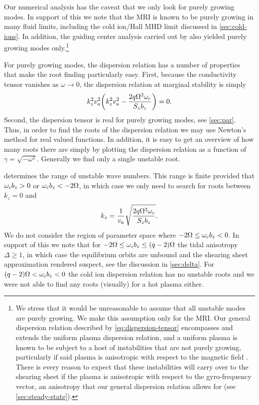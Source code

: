 \documentclass[aps,pre,notitlepage,amsmath,amssymb,amsfonts,nobibnotes,nofootinbib]{revtex4-1}
\begin{document}
Our numerical analysis has the caveat that we only look for purely growing
modes. In support of this we note that the MRI is known to be purely growing
in many fluid limits, including the cold ion/Hall MHD limit discussed in
\cref{sec:cold-ions}. In addition, the guiding center analysis carried out by
\citet{Quataert2002} also yielded purely growing modes only.\footnote{We
  stress that it would be unreasonable to assume that all unstable modes are
  purely growing. We make this assumption only for the MRI\@. Our general
  dispersion relation described by \cref{eq:dispersion-tensor} encompasses and
  extends the uniform plasma dispersion relation, and a uniform plasma is
  known to be subject to a host of instabilities that are not purely growing,
  particularly if said plasma is anisotropic with respect to the magnetic
  field \citep[see][and references therein]{Schekochihin2005,Sharma2006}.
  There is every reason to expect that these instabilities will carry over to
  the shearing sheet if the plasma is anisotropic with respect to the
  gyro-frequency vector, an anisotropy that our general dispersion relation
  allows for (see \cref{sec:steady-state}).}

For purely growing modes, the dispersion relation has a number of properties
that make the root finding particularly easy. First, because the conductivity
tensor vanishes as $\omega\to0$, the dispersion relation at marginal stability
is simply
\begin{equation}
  \label{eq:marginal-stability}
  k_z^2\va^2\left(k_z^2\va^2 - \frac{2q\Omega^2\omc}{S_z b_z}\right) = 0.
\end{equation}
Second, the dispersion tensor is real for purely growing modes, see
\cref{sec:par}. Thus, in order to find the roots of the dispersion relation we
may use Newton's method for real valued functions. In addition, it is easy to
get an overview of how many roots there are simply by plotting the dispersion
relation as a function of $\gamma=\sqrt{-\omega^2}$. Generally we find only a
single unstable root.

 determines the range of unstable wave numbers.
This range is finite provided that $\omega_c{}b_z>0$ or $\omega_c{}b_z<-2\Omega$, in
which case we only need to search for roots between $k_z=0$ and
\begin{equation}
  k_z = \frac{1}{v_a}\sqrt{\frac{2q\Omega^2\omega_c}{S_z b_z}}.
\end{equation}
We do not consider the region of parameter space where
$-2\Omega\le\omega_c{}b_z<0$. In support of this we note that for
$-2\Omega\le\omega_c{}b_z\le(q-2)\Omega$ the tidal anisotropy $\Delta\ge1$, in
which case the equilibrium orbits are unbound and the shearing sheet
approximation rendered suspect, see the discussion in \cref{sec:delta}. For
$(q-2)\Omega<\omega_c{}b_z<0$ the cold ion dispersion relation has no unstable
roots \citep{Wardle1999} and we were not able to find any roots (visually) for
a hot plasma either.
\end{document}
